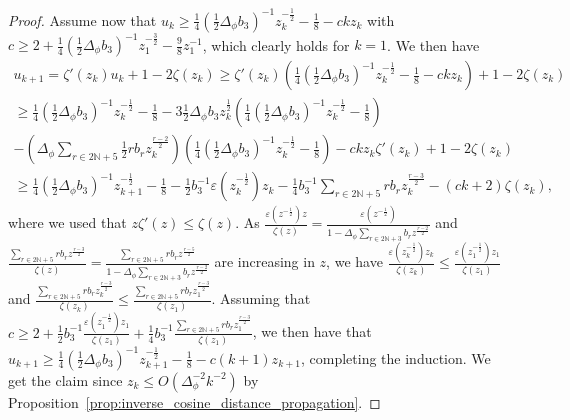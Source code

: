 \documentclass[twoside,11pt]{article}
\newcommand{\N}{\mathbb{N}}
\begin{document}
\begin{proof}
Assume now that $u_k \geq \frac{1}{4} (\frac{1}{2} \Delta_\phi b_3)^{-1} z_k^{-\frac{1}{2}} - \frac{1}{8} - c k z_k$ with $c \geq 2 + \frac{1}{4} (\frac{1}{2} \Delta_\phi b_3)^{-1} z_1^{-\frac{3}{2}} - \frac{9}{8} z_1^{-1}$, which clearly holds for $k=1$. We then have
\begin{multline*}
u_{k+1} = \zeta'(z_k) u_k + 1 - 2 \zeta(z_k)
\geq \zeta'(z_k) \left( \frac{1}{4} \left( \frac{1}{2} \Delta_\phi b_3 \right)^{-1} z_k^{-\frac{1}{2}} - \frac{1}{8} - c k z_k \right) + 1 - 2 \zeta(z_k) \\
\geq \frac{1}{4} \left( \frac{1}{2} \Delta_\phi b_3 \right)^{-1} z_k^{-\frac{1}{2}} - \frac{1}{8} - 3 \frac{1}{2} \Delta_\phi b_3 z_k^{\frac{1}{2}} \left( \frac{1}{4} \left( \frac{1}{2} \Delta_\phi b_3 \right)^{-1} z_k^{-\frac{1}{2}} - \frac{1}{8} \right) \\
- \left( \Delta_\phi \sum_{r \in 2\N+5} \frac{1}{2} r b_r z_k^{\frac{r-2}{2}} \right) \left( \frac{1}{4} \left( \frac{1}{2} \Delta_\phi b_3 \right)^{-1} z_k^{-\frac{1}{2}} - \frac{1}{8} \right) - c k z_k \zeta'(z_k) + 1 - 2 \zeta(z_k) \\
\geq \frac{1}{4} \left( \frac{1}{2} \Delta_\phi b_3 \right)^{-1} z_{k+1}^{-\frac{1}{2}} - \frac{1}{8} - \frac{1}{2} b_3^{-1} \varepsilon(z_k^{-\frac{1}{2}}) z_k - \frac{1}{4} b_3^{-1} \sum_{r \in 2\N+5} r b_r z_k^{\frac{r-3}{2}} - (ck+2) \zeta(z_k),
\end{multline*}
where we used that $z \zeta'(z) \leq \zeta(z)$. As $\frac{\varepsilon(z^{-\frac{1}{2}}) z}{\zeta(z)} = \frac{\varepsilon(z^{-\frac{1}{2}})}{1-\Delta_\phi \sum_{r \in 2\N+3} b_r z^{\frac{r-2}{2}}}$ and $\frac{\sum_{r \in 2\N+5} r b_r z^{\frac{r-3}{2}}}{\zeta(z)} = \frac{\sum_{r \in 2\N+5} r b_r z^{\frac{r-5}{2}}}{1-\Delta_\phi \sum_{r \in 2\N+3} b_r z^{\frac{r-2}{2}}}$ are increasing in $z$, we have $\frac{\varepsilon(z_k^{-\frac{1}{2}}) z_k}{\zeta(z_k)} \leq \frac{\varepsilon(z_1^{-\frac{1}{2}}) z_1}{\zeta(z_1)}$ and $\frac{\sum_{r \in 2\N+5} r b_r z_k^{\frac{r-3}{2}}}{\zeta(z_k)} \leq \frac{\sum_{r \in 2\N+5} r b_r z_1^{\frac{r-3}{2}}}{\zeta(z_1)}$. Assuming that $c \geq 2 + \frac{1}{2} b_3^{-1} \frac{\varepsilon(z_1^{-\frac{1}{2}}) z_1}{\zeta(z_1)} + \frac{1}{4} b_3^{-1} \frac{\sum_{r \in 2\N+5} r b_r z_1^{\frac{r-3}{2}}}{\zeta(z_1)}$, we then have that $u_{k+1} \geq \frac{1}{4} (\frac{1}{2} \Delta_\phi b_3)^{-1} z_{k+1}^{-\frac{1}{2}} - \frac{1}{8} - c (k+1) z_{k+1}$, completing the induction. We get the claim since $z_k \leq O(\Delta_\phi^{-2} k^{-2})$ by Proposition~\ref{prop:inverse_cosine_distance_propagation}.
\end{proof}
\end{document}
